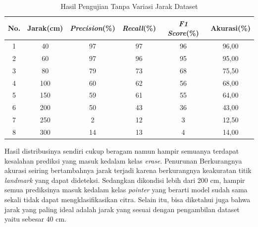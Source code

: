 \begin{longtable}{|c|c|c|c|c|c|}
  \caption{Hasil Pengujian Tanpa Variasi Jarak Dataset}
  \label{tb:Hasil Pengujian Tanpa Variasi Jarak Dataset}\\
  \hline
  \textbf{No.} & \textbf{Jarak(cm)} & \textbf{\emph{Precision}(\%)} & \textbf{\emph{Recall}(\%)} & \textbf{\emph{F1 Score}(\%)} & \textbf{Akurasi(\%)} \\
  \hline
  1 & 40  & 97 & 97 & 96 & 96,00  \\
  2 & 60  & 97 & 96 & 95 & 95,00  \\
  3 & 80  & 79 & 73 & 68 & 75,50  \\
  4 & 100 & 60 & 62 & 56 & 68,00  \\
  5 & 150 & 59 & 61 & 55 & 64,00  \\
  6 & 200 & 50 & 43 & 36 & 43,00  \\
  7 & 250 & 2 & 12 & 3 & 12,50  \\
  8 & 300 & 14 & 13 & 4 & 14,00  \\
  \hline
\end{longtable}


Hasil distribusinya sendiri cukup beragam namun hampir semuanya terdapat kesalahan prediksi yang masuk kedalam kelas \emph{erase}. Penurunan  Berkurangnya akurasi seiring bertambahnya jarak terjadi karena berkurangnya keakuratan titik \emph{landmark} yang dapat dideteksi. Sedangkan dikondisi lebih dari 200 cm, hampir semua prediksinya masuk kedalam kelas \emph{pointer} yang berarti model sudah sama sekali tidak dapat mengklasifikasikan citra. Selain itu, bisa diketahui juga bahwa jarak yang paling ideal adalah jarak yang sesuai dengan pengambilan dataset yaitu sebesar 40 cm.

